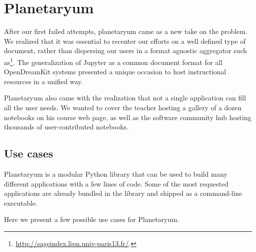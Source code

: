 \section{Planetaryum}\label{planetaryum}

After our first failed attempts, planetaryum came as a new take on the
problem. We realized that it was essential to recenter our efforts on a
well defined type of document, rather than dispersing our users in a
format agnostic aggregator such as\footnote{\url{http://sageindex.lipn.univ-paris13.fr/}.}.
The generalization of Jupyter as a common document format for all
OpenDreamKit systems presented a unique occasion to host instructional
resources in a unified way.

Planetaryum also came with the realization that not a single application
can fill all the user needs. We wanted to cover the teacher hosting a
gallery of a dozen notebooks on his course web page, as well as the
software community hub hosting thousands of user-contributed notebooks.

\subsection{Use cases}\label{use-cases}

Planetaryum is a modular Python library that can be used to build many
different applications with a few lines of code. Some of the most
requested applications are already bundled in the library and shipped as
a command-line executable.

Here we present a few possible use cases for Planetaryum.

